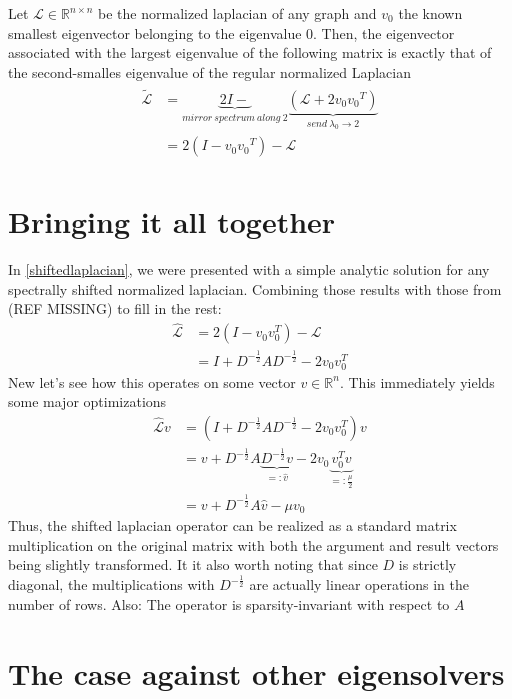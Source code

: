 \documentclass[10pt, a4paper, twocolumn]{article}
\begin{document}
    \newtheorem{combined}[]{Corollary: Making the $v_2$ accessible }[section]
    \begin{shifting}
        Let $\mathcal{L} \in \mathbb{R}^{n \times n}$ be the normalized laplacian of any graph and $v_0$ the known
        smallest eigenvector belonging to the eigenvalue $0$. Then, the eigenvector associated with the largest
        eigenvalue of the following matrix is exactly that of the second-smalles eigenvalue of the regular
        normalized Laplacian
        \begin{align}
            \begin{split}
                \tilde{\mathcal{L}} & = \underbrace{2I -}_{mirror\ spectrum\ along\ 2} \underbrace{\left( \mathcal{L} + 2 v_0 {v_0}^T \right)}_{send\ \lambda_0 \rightarrow 2} \\
                & = 2 \left( I - v_0 {v_0}^T \right) - \mathcal{L}
            \end{split}
        \end{align}
    \end{shifting}

    \section{Bringing it all together}
    In \eqref{shiftedlaplacian}, we were presented with a simple analytic solution for any spectrally shifted normalized laplacian.
    Combining those results with those from (REF MISSING) to fill in the rest:
    \begin{equation}
        \begin{split}
            \hat{\mathcal{L}} & = 2 ( I - v_0 v_0^T ) - \mathcal{L}\\
            & = I + D^{-\frac{1}{2}} A D^{-\frac{1}{2}} - 2 v_0 v_0^T
        \end{split}
    \end{equation}
    New let's see how this operates on some vector $v \in \mathbb{R}^n$. This immediately yields some major optimizations
    \begin{equation}
        \begin{split}
            \hat{\mathcal{L}}v & = \left( I + D^{-\frac{1}{2}} A D^{-\frac{1}{2}} - 2 v_0 v_0^T\right) v\\
            & = v + D^{-\frac{1}{2}} A \underbrace{D^{-\frac{1}{2}} v}_{=:\hat{v}} - 2 v_0 \underbrace{v_0^T v}_{=:\frac{\mu}{2}}\\
            & = v + D^{-\frac{1}{2}} A \hat{v} - \mu v_0
        \end{split}
    \end{equation}
    Thus, the shifted laplacian operator can be realized as a standard matrix multiplication on the original matrix with both the
    argument and result vectors being slightly transformed. It it also worth noting that since $D$ is strictly diagonal, the multiplications with $D^{-\frac{1}{2}}$
    are actually linear operations in the number of rows. Also: The operator is sparsity-invariant with respect to $A$


    \section{The case against other eigensolvers}

    \printbibliography[title={Bibliography}]
\end{document}
